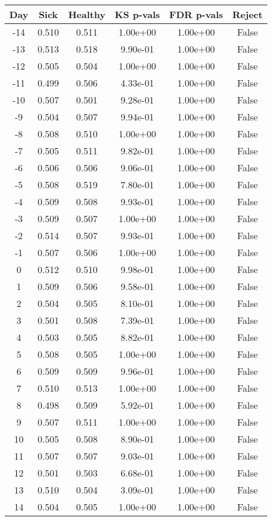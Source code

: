 \begin{tabular}{c|c|c|c|c|c}
Day &  Sick & Healthy &  KS p-vals & FDR p-vals & Reject\\
\hline
-14 & 0.510 &   0.511 &   1.00e+00 &   1.00e+00 &  False\\
-13 & 0.513 &   0.518 &   9.90e-01 &   1.00e+00 &  False\\
-12 & 0.505 &   0.504 &   1.00e+00 &   1.00e+00 &  False\\
-11 & 0.499 &   0.506 &   4.33e-01 &   1.00e+00 &  False\\
-10 & 0.507 &   0.501 &   9.28e-01 &   1.00e+00 &  False\\
 -9 & 0.504 &   0.507 &   9.94e-01 &   1.00e+00 &  False\\
 -8 & 0.508 &   0.510 &   1.00e+00 &   1.00e+00 &  False\\
 -7 & 0.505 &   0.511 &   9.82e-01 &   1.00e+00 &  False\\
 -6 & 0.506 &   0.506 &   9.06e-01 &   1.00e+00 &  False\\
 -5 & 0.508 &   0.519 &   7.80e-01 &   1.00e+00 &  False\\
 -4 & 0.509 &   0.508 &   9.93e-01 &   1.00e+00 &  False\\
 -3 & 0.509 &   0.507 &   1.00e+00 &   1.00e+00 &  False\\
 -2 & 0.514 &   0.507 &   9.93e-01 &   1.00e+00 &  False\\
 -1 & 0.507 &   0.506 &   1.00e+00 &   1.00e+00 &  False\\
  0 & 0.512 &   0.510 &   9.98e-01 &   1.00e+00 &  False\\
  1 & 0.509 &   0.506 &   9.58e-01 &   1.00e+00 &  False\\
  2 & 0.504 &   0.505 &   8.10e-01 &   1.00e+00 &  False\\
  3 & 0.501 &   0.508 &   7.39e-01 &   1.00e+00 &  False\\
  4 & 0.503 &   0.505 &   8.82e-01 &   1.00e+00 &  False\\
  5 & 0.508 &   0.505 &   1.00e+00 &   1.00e+00 &  False\\
  6 & 0.509 &   0.509 &   9.96e-01 &   1.00e+00 &  False\\
  7 & 0.510 &   0.513 &   1.00e+00 &   1.00e+00 &  False\\
  8 & 0.498 &   0.509 &   5.92e-01 &   1.00e+00 &  False\\
  9 & 0.507 &   0.511 &   1.00e+00 &   1.00e+00 &  False\\
 10 & 0.505 &   0.508 &   8.90e-01 &   1.00e+00 &  False\\
 11 & 0.507 &   0.507 &   9.03e-01 &   1.00e+00 &  False\\
 12 & 0.501 &   0.503 &   6.68e-01 &   1.00e+00 &  False\\
 13 & 0.510 &   0.504 &   3.09e-01 &   1.00e+00 &  False\\
 14 & 0.504 &   0.505 &   1.00e+00 &   1.00e+00 &  False\\
\end{tabular}